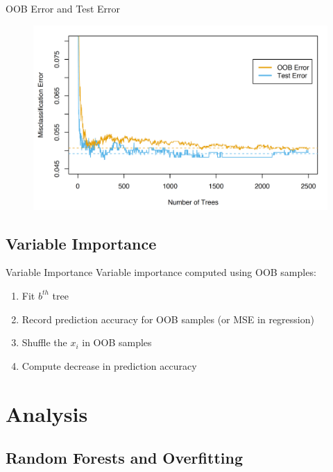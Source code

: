 \documentclass[pdf]{beamer}
\begin{document}
		\begin{frame}{OOB Error and Test Error}
			\begin{figure}
				\includegraphics[scale = 0.25]{oob_error.png}
			\end{figure}		
    		\end{frame}
		
		
	\subsection{Variable Importance}
		\begin{frame}{Variable Importance}
			Variable importance computed using OOB samples:
			
			
			\begin{enumerate} [  1.]
				\item Fit $b^{th}$ tree
				\item Record prediction accuracy for OOB samples (or MSE in regression)
				\item Shuffle the $x_i$ in OOB samples
				\item Compute decrease in prediction accuracy
			\end{enumerate}
		\end{frame}
		





\section{Analysis}

	\subsection{Random Forests and Overfitting}
	
\end{document}
